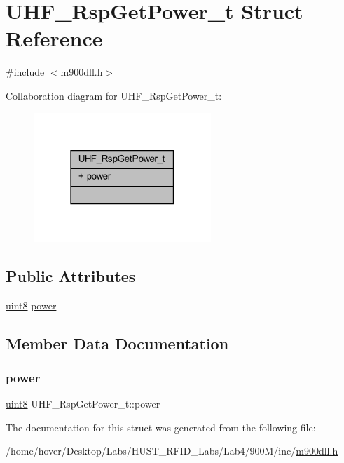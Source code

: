 \hypertarget{struct_u_h_f___rsp_get_power__t}{}\section{U\+H\+F\+\_\+\+Rsp\+Get\+Power\+\_\+t Struct Reference}
\label{struct_u_h_f___rsp_get_power__t}


{\ttfamily \#include $<$m900dll.\+h$>$}



Collaboration diagram for U\+H\+F\+\_\+\+Rsp\+Get\+Power\+\_\+t\+:
\nopagebreak
\begin{figure}[H]
\begin{center}
\leavevmode
\includegraphics[width=190pt]{struct_u_h_f___rsp_get_power__t__coll__graph}
\end{center}
\end{figure}
\subsection*{Public Attributes}
\begin{DoxyCompactItemize}
\item 
\mbox{\hyperlink{m900dll_8h_adde6aaee8457bee49c2a92621fe22b79}{uint8}} \mbox{\hyperlink{struct_u_h_f___rsp_get_power__t_aa61fdf3232a796eea3b07e41e4c6d764}{power}}
\end{DoxyCompactItemize}


\subsection{Member Data Documentation}
\mbox{\label{struct_u_h_f___rsp_get_power__t_aa61fdf3232a796eea3b07e41e4c6d764}} 
\subsubsection{\texorpdfstring{power}{power}}
{\footnotesize\ttfamily \mbox{\hyperlink{m900dll_8h_adde6aaee8457bee49c2a92621fe22b79}{uint8}} U\+H\+F\+\_\+\+Rsp\+Get\+Power\+\_\+t\+::power}



The documentation for this struct was generated from the following file\+:\begin{DoxyCompactItemize}
\item 
/home/hover/\+Desktop/\+Labs/\+H\+U\+S\+T\+\_\+\+R\+F\+I\+D\+\_\+\+Labs/\+Lab4/900\+M/inc/\mbox{\hyperlink{m900dll_8h}{m900dll.\+h}}\end{DoxyCompactItemize}

